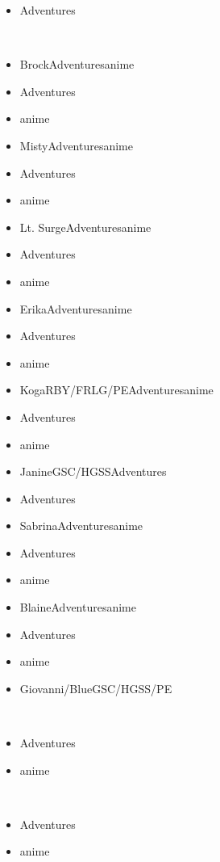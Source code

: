 \documentclass[a4paper,12pt]{article}
\begin{document}
\begin{itemize}
\item Adventures
\end{itemize}\\ \par \vspace{0.5cm}

\begin{itemize}
\item BrockAdventuresanime
\item Adventures
\item anime
\item MistyAdventuresanime
\item Adventures
\item anime
\item Lt. SurgeAdventuresanime
\item Adventures
\item anime
\item ErikaAdventuresanime
\item Adventures
\item anime
\item KogaRBY/FRLG/PEAdventuresanime
\item Adventures
\item anime
\item JanineGSC/HGSSAdventures
\item Adventures
\item SabrinaAdventuresanime
\item Adventures
\item anime
\item BlaineAdventuresanime
\item Adventures
\item anime
\item Giovanni/BlueGSC/HGSS/PE
\end{itemize}\\ \par \vspace{0.5cm}

\begin{itemize}
\item Adventures
\item anime
\end{itemize}\\ \par \vspace{0.5cm}

\begin{itemize}
\item Adventures
\item anime
\end{itemize}\\ \par \vspace{0.5cm}
\end{document}
